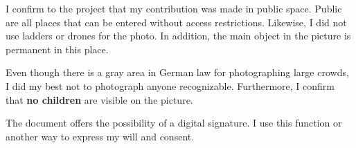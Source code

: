 \documentclass[parskip=half]{scrreprt}
\begin{document}
\begin{contract}
	I confirm to the project that my contribution was made in public space. Public are all places that can be entered without access restrictions. Likewise, I did not use ladders or drones for the photo.
	In addition, the main object in the picture is permanent in this place.
	
	Even though there is a gray area in German law for photographing large crowds, I did my best not to photograph anyone recognizable. Furthermore, I confirm that \textbf{no children} are visible on the picture.
	
	The document offers the possibility of a digital signature. I use this function or another way to express my will and consent. 
	
	\begin{Form}
	\end{Form}
	
\end{contract}
\end{document}
